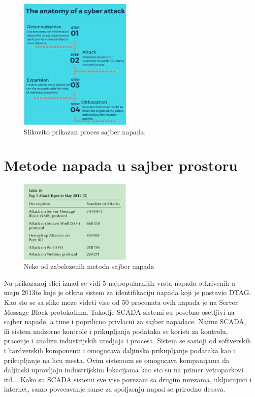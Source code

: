 \documentclass[a4paper]{article}
\begin{document}
{\begin{figure}[h!]
  \centering
  \begin{center}
  \includegraphics[width=55mm]{index.jpeg}
  \end{center}
  \caption{Slikovito prikazan proces sajber napada.}
  \label{fig:vr1}
\end{figure}

\newpage

\section{Metode napada u sajber prostoru}
\label{sec:naslov2}

 \begin{figure}[h!]
  \centering
  \begin{center}
  \includegraphics[width=55mm]{slika2.jpg}
  \end{center}
  \caption{Neke od zabelezenih metoda sajber napada}
  \label{fig:vr1}
\end{figure}

Na prikazanoj slici iznad se vidi 5 najpopularnijih vrsta napada otkrivenih u maju 2013te koje je otkrio sistem za identifikaciju napada koji je postavio DTAG. Kao sto se sa slike moze videti vise od 50 procenata ovih napada je na Server Message Block protokolima.
Takodje SCADA sistemi su posebno osetljivi na sajber napade, a time i poprilicno privlacni za sajber napadace. Naime SCADA, ili sistem nadzorne kontrole i prikupljanja podataka se koristi za kontrolu, pracenje i analizu industrijskih uredjaja i procesa.
Sistem se sastoji od softverskih i hardverskih komponenti i omogucava daljinsko prikupljanje podataka kao i prikupljanje na licu mesta. Ovim sistemom se omogucava kompanijama da daljinski upravljaju industrijskim lokacijama kao sto su na primer vetroparkovi itd...
Kako su SCADA sistemi sve vise povezani sa drugim mrezama, ukljucujuci i internet, samo povecavanje sanse za spoljasnju napad se prirodno desava.


}
\end{document}
